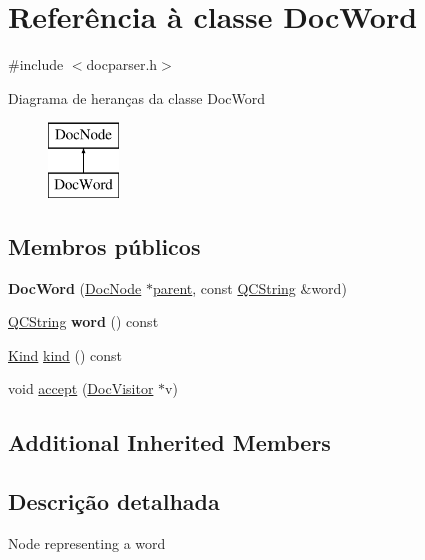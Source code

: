 \hypertarget{class_doc_word}{\section{Referência à classe Doc\-Word}
\label{class_doc_word}
}


{\ttfamily \#include $<$docparser.\-h$>$}

Diagrama de heranças da classe Doc\-Word\begin{figure}[H]
\begin{center}
\leavevmode
\includegraphics[height=2.000000cm]{class_doc_word}
\end{center}
\end{figure}
\subsection*{Membros públicos}
\begin{DoxyCompactItemize}
\item 
\hypertarget{class_doc_word_a4b8d58b209dc556a5a0c2bb843d4c5ea}{{\bfseries Doc\-Word} (\hyperlink{class_doc_node}{Doc\-Node} $\ast$\hyperlink{class_doc_node_abd7f070d6b0a38b4da71c2806578d19d}{parent}, const \hyperlink{class_q_c_string}{Q\-C\-String} \&word)}\label{class_doc_word_a4b8d58b209dc556a5a0c2bb843d4c5ea}

\item 
\hypertarget{class_doc_word_a2c052f8584abb7e8711181e45c0ef55e}{\hyperlink{class_q_c_string}{Q\-C\-String} {\bfseries word} () const }\label{class_doc_word_a2c052f8584abb7e8711181e45c0ef55e}

\item 
\hyperlink{class_doc_node_aa10c9e8951b8ccf714a59ec321bdac5b}{Kind} \hyperlink{class_doc_word_aa9d037bed9f9a083d0cd01485637d843}{kind} () const 
\item 
void \hyperlink{class_doc_word_a7ba716e854ae2f8f87a4eb2140e302b6}{accept} (\hyperlink{class_doc_visitor}{Doc\-Visitor} $\ast$v)
\end{DoxyCompactItemize}
\subsection*{Additional Inherited Members}


\subsection{Descrição detalhada}
Node representing a word 

